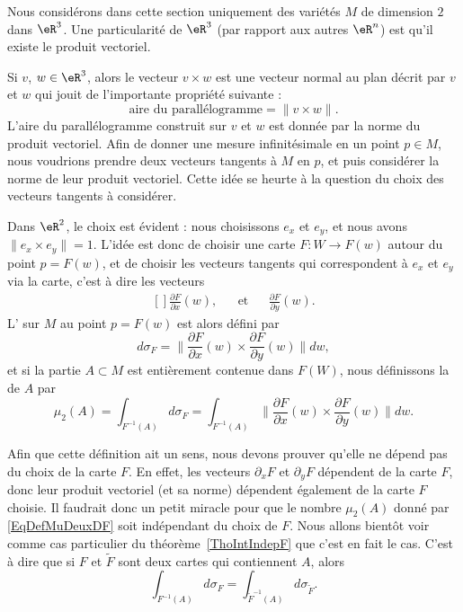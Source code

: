 Nous considérons dans cette section uniquement des variétés $M$ de dimension $2$ dans $\eR^3$.  Une particularité de $\eR^3$ (par rapport aux autres $\eR^n$) est qu'il existe le produit vectoriel.

Si $v$, $w\in\eR^3$, alors le vecteur $v\times w$ est une vecteur normal au plan décrit par $v$ et $w$ qui jouit de l'importante propriété suivante :
\begin{equation}
	\text{aire du parallélogramme}=\| v\times w \|.
\end{equation}
L'aire du parallélogramme construit sur $v$ et $w$ est donnée par la norme du produit vectoriel. Afin de donner une mesure infinitésimale en un point $p\in M$, nous voudrions prendre deux vecteurs tangents à $M$ en $p$, et puis considérer la norme de leur produit vectoriel. Cette idée se heurte à la question du choix des vecteurs tangents à considérer.

Dans $\eR^2$, le choix est évident : nous choisissons $e_x$ et $e_y$, et nous avons $\|e_x\times e_y\|=1$. L'idée est donc de choisir une carte $F\colon W\to F(w)$ autour du point $p=F(w)$, et de choisir les vecteurs tangents qui correspondent à $e_x$ et $e_y$ via la carte, c'est à dire les vecteurs
\begin{equation}
	\begin{aligned}[]
		\frac{ \partial F }{ \partial x }(w),&&\text{et}&&\frac{ \partial F }{ \partial y }(w).
	\end{aligned}
\end{equation}
L' sur $M$ au point $p=F(w)$ est alors défini par
\begin{equation}
	d\sigma_F=\|  \frac{ \partial F }{ \partial x }(w)\times\frac{ \partial F }{ \partial y }(w) \|dw,
\end{equation}
et si la partie $A\subset M$ est entièrement contenue dans $F(W)$, nous définissons la  de $A$ par
\begin{equation}		\label{EqDefMuDeuxDF}
	\mu_2(A)=\int_{F^{-1}(A)}d\sigma_F=\int_{F^{-1}(A)}\| \frac{ \partial F }{ \partial x }(w)\times\frac{ \partial F }{ \partial y }(w) \|dw.
\end{equation}
\begin{remark}
	Afin que cette définition ait un sens, nous devons prouver qu'elle ne dépend pas du choix de la carte $F$. En effet, les vecteurs $\partial_xF$ et $\partial_yF$ dépendent de la carte $F$, donc leur produit vectoriel (et sa norme) dépendent également de la carte $F$ choisie. Il faudrait donc un petit miracle pour que le nombre $\mu_2(A)$ donné par \eqref{EqDefMuDeuxDF} soit indépendant du choix de $F$.  Nous allons bientôt voir comme cas particulier du théorème~\ref{ThoIntIndepF} que c'est en fait le cas. C'est à dire que si $F$ et $\tilde F$ sont deux cartes qui contiennent $A$, alors
	\begin{equation}
		\int_{F^{-1}(A)}d\sigma_F=\int_{\tilde F^{-1}(A)}d\sigma_{\tilde F}.
	\end{equation}
\end{remark}

